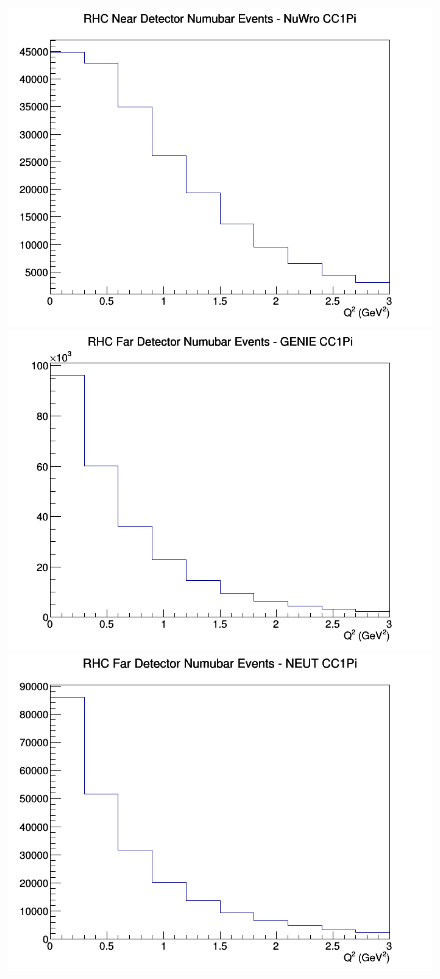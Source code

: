 \begin{figure}[h]
\includegraphics[width=\linewidth]{Q2/nominal/CC1Pi_RHC_ND_numubar_Q2_NuWro.png}
\endminipage
\newline
{}
\includegraphics[width=\linewidth]{Q2/nominal/CC1Pi_RHC_FD_numubar_Q2_GENIE.png}
\endminipage
{}
\includegraphics[width=\linewidth]{Q2/nominal/CC1Pi_RHC_FD_numubar_Q2_NEUT.png}

\end{figure}
